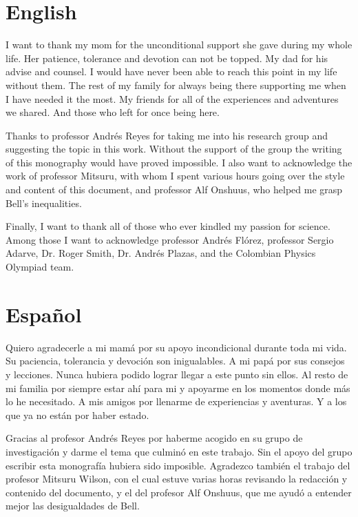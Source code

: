 \documentclass[12pt]{report}
\theoremstyle{definition}
\begin{document}
\section*{English}

I want to thank my mom for the unconditional support she gave during my whole life. Her patience, tolerance and devotion can not be topped. My dad for his advise and counsel. I would have never been able to reach this point in my life without them. The rest of my family for always being there supporting me when I have needed it the most. My friends for all of the experiences and adventures we shared. And those who left for once being here.

Thanks to professor Andrés Reyes for taking me into his research group and suggesting the topic in this work. Without the support of the group the writing of this monography would have proved impossible. I also want to acknowledge the work of professor Mitsuru, with whom I spent various hours going over the style and content of this document, and professor Alf Onshuus, who helped me grasp Bell's inequalities.

Finally, I want to thank all of those who ever kindled my passion for science. Among those I want to acknowledge professor Andrés Flórez, professor Sergio Adarve, Dr. Roger Smith, Dr. Andrés Plazas, and the Colombian Physics Olympiad team. 

\section*{Español}

Quiero agradecerle a mi mamá por su apoyo incondicional durante toda mi vida. Su paciencia, tolerancia y devoción son inigualables. A mi papá por sus consejos y lecciones. Nunca hubiera podido lograr llegar a este punto sin ellos. Al resto de mi familia por siempre estar ahí para mi y apoyarme en los momentos donde más lo he necesitado. A mis amigos por llenarme de experiencias y aventuras. Y a los que ya no están por haber estado.

Gracias al profesor Andrés Reyes por haberme acogido en su grupo de investigación y darme el tema que culminó en este trabajo. Sin el apoyo del grupo escribir esta monografía hubiera sido imposible. Agradezco también el trabajo del profesor Mitsuru Wilson, con el cual estuve varias horas revisando la redacción y contenido del documento, y el del profesor Alf Onshuus, que me ayudó a entender mejor las desigualdades de Bell.
\end{document}
